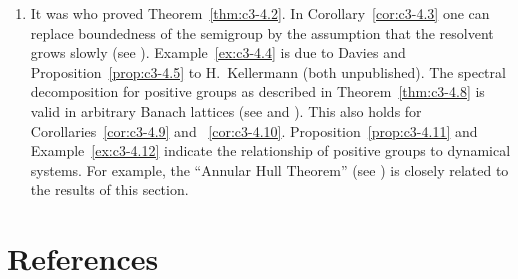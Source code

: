 \begin{enumerate}[label=\emph{Section \arabic*:}, wide, itemsep=1ex]
\item 
It was \textcite{derndinger:1980} who proved Theorem~\ref{thm:c3-4.2}. 
In Corollary~\ref{cor:c3-4.3} one can replace boundedness of the semigroup by the assumption that the resolvent grows slowly (see \textcite{greiner:1982}). 
Example~\ref{ex:c3-4.4} is due to Davies and Proposition~\ref{prop:c3-4.5} to H.~Kellermann (both unpublished). 
The spectral decomposition for positive groups as described in Theorem~\ref{thm:c3-4.8} is valid in arbitrary Banach lattices (see \textcite{arendt:1982} and \textcite{greiner:1984c}). 
This also holds for Corollaries~\ref{cor:c3-4.9} and ~\ref{cor:c3-4.10}. 
Proposition~\ref{prop:c3-4.11} and Example~\ref{ex:c3-4.12} indicate the relationship of positive groups to dynamical systems. 
For example, the \enquote{Annular Hull Theorem} (see \textcite{chiconeswanson:1981}) is closely related to the results of this section.
\end{enumerate}
\section*{References}
{\RaggedRight
  \printbibliography[heading=none]
 }
